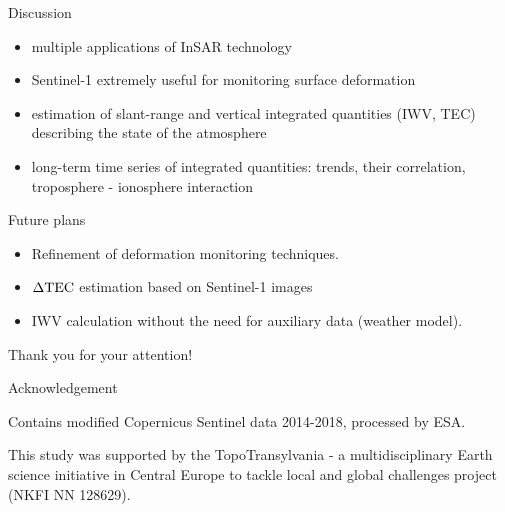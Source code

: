 \documentclass{beamer}
\begin{document}
\begin{frame}{}

    {\Large \fcol Discussion}
    
    \begin{itemize}
        \item multiple applications of InSAR technology
        \item Sentinel-1 extremely useful for monitoring surface deformation
        \item estimation of slant-range and vertical integrated quantities (IWV, TEC) describing the state of the atmosphere
        \item long-term time series of integrated quantities: trends, their correlation, troposphere - ionosphere interaction
    \end{itemize}
    
    \vspace{10pt}
    
    {\Large \fcol Future plans}
    
    \begin{itemize}
        \item Refinement of deformation monitoring techniques.
        \item $\Delta\mathrm{TEC}$ estimation based on Sentinel-1 images
        \item IWV calculation without the need for auxiliary data (weather model).
    \end{itemize}
\end{frame}


\begin{frame}
    \begin{center}
        \Huge \fcol
        Thank you for your attention!
    \end{center}
    \vspace{25pt}
    
    \begin{center}
        \Large \fcol \center Acknowledgement
    \end{center}
    \vspace{10pt}
    
    Contains modified Copernicus Sentinel data 2014-2018, processed by ESA.
    \vspace{5pt}
    
    This study was supported by the TopoTransylvania - a multidisciplinary Earth science initiative in Central Europe to tackle local and global challenges project (NKFI NN 128629).
\end{frame}
\end{document}
